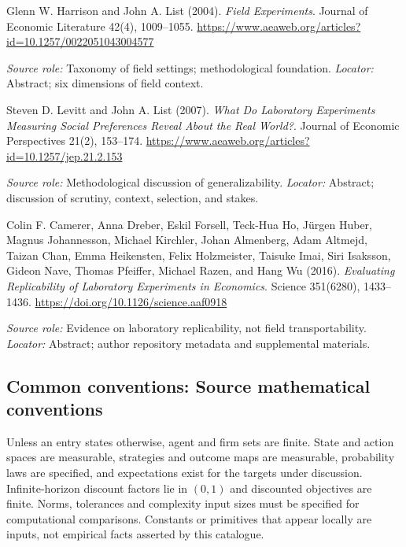 \documentclass[11pt,a4paper]{article}
\begin{document}
\begin{enumerate}[label={[S\arabic*]},leftmargin=*]

\item Glenn W. Harrison and John A. List (2004). \emph{Field Experiments}. Journal of Economic Literature 42(4), 1009--1055. \url{https://www.aeaweb.org/articles?id=10.1257/0022051043004577}\par \textit{Source role:} Taxonomy of field settings; methodological foundation. \textit{Locator:} Abstract; six dimensions of field context.

\item Steven D. Levitt and John A. List (2007). \emph{What Do Laboratory Experiments Measuring Social Preferences Reveal About the Real World?}. Journal of Economic Perspectives 21(2), 153--174. \url{https://www.aeaweb.org/articles?id=10.1257/jep.21.2.153}\par \textit{Source role:} Methodological discussion of generalizability. \textit{Locator:} Abstract; discussion of scrutiny, context, selection, and stakes.

\item Colin F. Camerer, Anna Dreber, Eskil Forsell, Teck-Hua Ho, Jürgen Huber, Magnus Johannesson, Michael Kirchler, Johan Almenberg, Adam Altmejd, Taizan Chan, Emma Heikensten, Felix Holzmeister, Taisuke Imai, Siri Isaksson, Gideon Nave, Thomas Pfeiffer, Michael Razen, and Hang Wu (2016). \emph{Evaluating Replicability of Laboratory Experiments in Economics}. Science 351(6280), 1433--1436. \url{https://doi.org/10.1126/science.aaf0918}\par \textit{Source role:} Evidence on laboratory replicability, not field transportability. \textit{Locator:} Abstract; author repository metadata and supplemental materials.

\end{enumerate}

\subsection*{Common conventions: Source mathematical conventions}

Unless an entry states otherwise, agent and firm sets are finite. State and action spaces are measurable, strategies and outcome maps are measurable, probability laws are specified, and expectations exist for the targets under discussion. Infinite-horizon discount factors lie in $(0,1)$ and discounted objectives are finite. Norms, tolerances and complexity input sizes must be specified for computational comparisons. Constants or primitives that appear locally are inputs, not empirical facts asserted by this catalogue.
\end{document}
